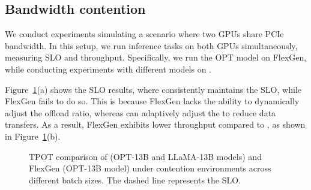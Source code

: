 \subsection{Bandwidth contention}

We conduct experiments simulating a scenario where two GPUs share PCIe bandwidth. In this setup, we run inference tasks on both GPUs simultaneously, 
measuring SLO and throughput. Specifically, we run the OPT model on FlexGen, while conducting experiments with different models on \sys. 

Figure~\ref{fig:evalband}(a) shows the SLO results, where \sys consistently maintains the SLO, while FlexGen fails to do so. 
This is because FlexGen lacks the ability to dynamically adjust the offload ratio, whereas \sys can adaptively adjust the \interval to reduce data transfers. 
As a result, FlexGen exhibits lower throughput compared to \sys, as shown in Figure~\ref{fig:evalband}(b).


\begin{figure}[t]
    \centering
    \resizebox{0.9\columnwidth}{!}{
 }
    \caption{TPOT comparison of \sys (OPT-13B and LLaMA-13B models) and FlexGen (OPT-13B model) under contention environments across different batch sizes.
 The dashed line represents the SLO.}
    \label{fig:evalband}
\end{figure}




